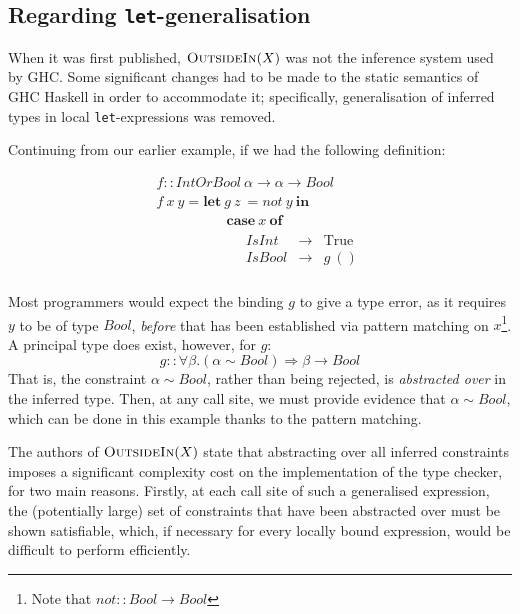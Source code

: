 \documentclass[a4paper]{jfp}
\newcommand{\outsidein}{\textsc{OutsideIn}(X)}
\begin{document}
\subsection{Regarding {\tt let}-generalisation}

When it was first published, $\outsidein$ was not the inference system used by GHC\@. Some significant changes had to be made to the static semantics
of GHC Haskell in order to accommodate it; specifically, generalisation of inferred types in local {\tt let}-expressions was removed. 

Continuing from our earlier example, if we had the following definition:

\nopagebreak

\begin{displaymath}
\begin{array}{ll}
\mathit{f} :: \mathit{IntOrBool}\ \alpha \rightarrow \alpha \rightarrow \mathit{Bool} \\
\mathit{f}\ x\ y = \textbf{let}\ g\ z\ = \mathit{not}\ y\ \textbf{in}  \\
\quad\quad\quad\quad\quad\textbf{case}\ x\ \textbf{of} \\
\quad\quad\quad\quad\quad\quad\begin{array}{lll}
   \mathit{IsInt} & \rightarrow & \text{True} \\
   \mathit{IsBool} & \rightarrow & g\ ()\\
   \end{array}
\end{array}
\end{displaymath}

Most programmers would expect the binding $g$ to give a type error, as it requires $y$ to be of type $\mathit{Bool}$, \emph{before} that has been 
established via pattern matching on $x$\footnote{Note that 
   $\mathit{not} :: \mathit{Bool} \rightarrow \mathit{Bool}$}. 
A principal type does exist, however, for $g$: 
\begin{displaymath}
   g :: \forall \beta. (\alpha \sim \mathit{Bool}) \Rightarrow \beta \rightarrow \mathit{Bool}
\end{displaymath}
That is, the constraint $\alpha \sim \mathit{Bool}$, rather than being rejected, is \emph{abstracted over} in the inferred type. Then, at any call site,
we must provide evidence that $\alpha \sim \mathit{Bool}$, which can be done in this example thanks to the pattern matching. 

The authors of $\outsidein$ state that abstracting over all inferred constraints imposes a significant complexity cost on the implementation of the
type checker, for two main reasons. Firstly, at each call site of such a generalised expression, the (potentially large) set of constraints that have
been abstracted over must be shown satisfiable, which, if necessary for every locally bound expression, would be difficult to perform efficiently.
\end{document}
